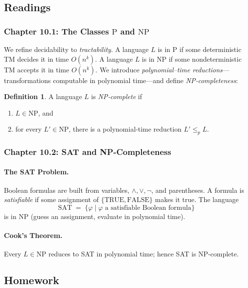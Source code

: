 \documentclass{article}
\theoremstyle{theorem}
\theoremstyle{definition}
\newtheorem{definition}[theorem]{Definition}
\theoremstyle{remark}
\begin{document}
\subsection{Readings}

\subsubsection*{Chapter 10.1: The Classes \(\mathrm{P}\) and \(\mathrm{NP}\)}  
We refine decidability to \emph{tractability}.  A language \(L\) is in
\(\mathrm{P}\) if some deterministic TM decides it in time \(O(n^k)\).  A
language \(L\) is in \(\mathrm{NP}\) if some nondeterministic TM accepts
it in time \(O(n^k)\).  We introduce \emph{polynomial–time reductions}—
transformations computable in polynomial time—and define \emph{NP‐completeness}:

\begin{definition}
A language \(L\) is \emph{NP‐complete} if
\begin{enumerate}
  \item \(L\in\mathrm{NP}\), and
  \item for every \(L'\in\mathrm{NP}\), there is a polynomial‐time reduction
    \(L'\le_p L\).
\end{enumerate}
\end{definition}

\subsubsection*{Chapter 10.2: SAT and NP‐Completeness}\label{sec:chapter10.2}
\paragraph{The SAT Problem.}  Boolean formulas are built from variables,
\(\land,\lor,\lnot\), and parentheses.  A formula is \emph{satisfiable} if
some assignment of \(\{\mathrm{TRUE},\mathrm{FALSE}\}\) makes it true.
The language
\[
  \mathrm{SAT}
  \;=\;
  \bigl\{\varphi\mid \varphi\text{ a satisfiable Boolean formula}\bigr\}
\]
is in \(\mathrm{NP}\) (guess an assignment, evaluate in polynomial time).
\paragraph{Cook’s Theorem.}  Every \(L\in\mathrm{NP}\) reduces to SAT in
polynomial time; hence SAT is NP‐complete.

\subsection{Homework}\label{sec:week8-9-exercises}
\end{document}
